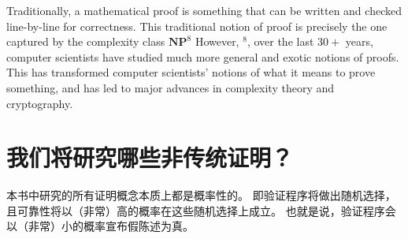 Traditionally, a mathematical proof is something that can be written and checked line-by-line for correctness. This traditional notion of proof is precisely the one captured by the complexity class $\mathbf{N P}^8$ However, $^8$, over the last $30+$ years, computer scientists have studied much more general and exotic notions of proofs. This has transformed computer scientists' notions of what it means to prove something, and has led to major advances in complexity theory and cryptography.

\section{我们将研究哪些非传统证明？}
本书中研究的所有证明概念本质上都是概率性的。
即验证程序将做出随机选择，且可靠性将以（非常）高的概率在这些随机选择上成立。 
也就是说，验证程序会以（非常）小的概率宣布假陈述为真。

